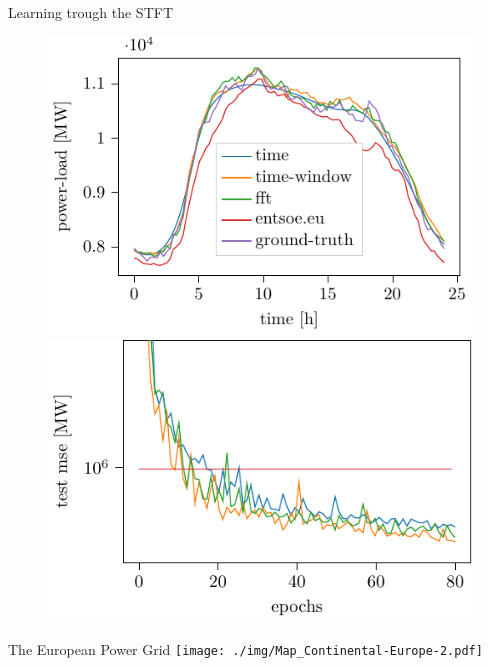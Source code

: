 \documentclass[xcolor=dvipsnames]{beamer}
\begin{document}
\begin{frame}{Learning trough the STFT \cite{wolter2018Fourier}}
\begin{figure}
    \centering
    \includegraphics[width=0.49\linewidth]{./img/day_ahead_plot.pdf}
    \includegraphics[width=0.49\linewidth]{./img/power_pred_15min_1d_test.pdf}
\end{figure}
\end{frame}

\begin{frame}{The European Power Grid}
\centering
\texttt{[image: ./img/Map\_Continental-Europe-2.pdf]}
\end{frame}
\end{document}
